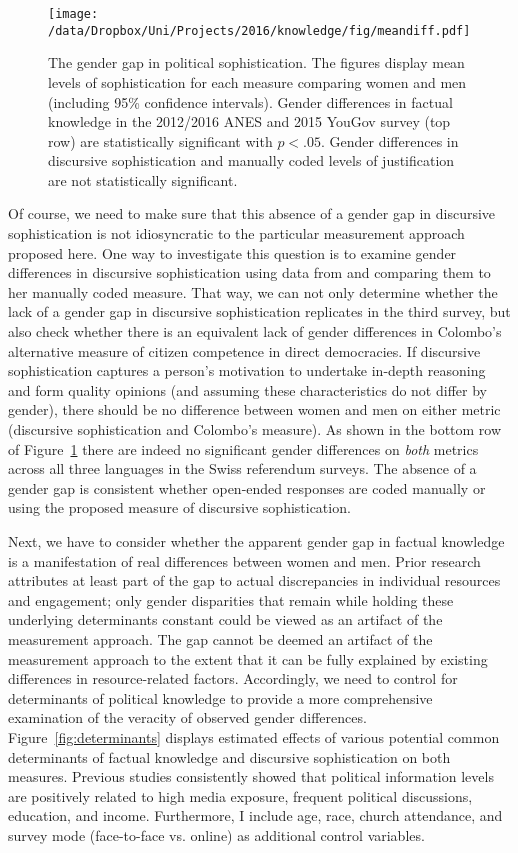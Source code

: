 \begin{figure}[h]\centering
	\texttt{[image: /data/Dropbox/Uni/Projects/2016/knowledge/fig/meandiff.pdf]}
	\caption[The gender gap in political sophistication]{The gender gap in political sophistication. The figures display mean levels of sophistication for each measure comparing women and men (including 95\% confidence intervals). Gender differences in factual knowledge in the 2012/2016 ANES and 2015 YouGov survey (top row) are statistically significant with $p<.05$. Gender differences in discursive sophistication and manually coded levels of justification \citep{colombo2016justifications} are not statistically significant.}\label{fig:meandiff}
\end{figure}

Of course, we need to make sure that this absence of a gender gap in discursive sophistication is not idiosyncratic to the particular measurement approach proposed here. One way to investigate this question is to examine gender differences in discursive sophistication using data from \citet{colombo2016justifications} and comparing them to her manually coded measure. That way, we can not only determine whether the lack of a gender gap in discursive sophistication replicates in the third survey, but also check whether there is an equivalent lack of gender differences in Colombo's alternative measure of citizen competence in direct democracies. If discursive sophistication captures a person's motivation to undertake in-depth reasoning and form quality opinions (and assuming these characteristics do not differ by gender), there should be no difference between women and men on either metric (discursive sophistication and Colombo's measure).  As shown in the bottom row of Figure~\ref{fig:meandiff} there are indeed no significant gender differences on \textit{both} metrics across all three languages in the Swiss referendum surveys. The absence of a gender gap is consistent whether open-ended responses are coded manually or using the proposed measure of discursive sophistication.

Next, we have to consider whether the apparent gender gap in factual knowledge is a manifestation of real differences between women and men. Prior research attributes at least part of the gap to actual discrepancies in individual resources and engagement; only gender disparities that remain while holding these underlying determinants constant could be viewed as an artifact of the measurement approach. The gap cannot be deemed an artifact of the measurement approach to the extent that it can be fully explained by existing differences in resource-related factors. Accordingly, we need to control for determinants of political knowledge to provide a more comprehensive examination of the veracity of observed gender differences. Figure~\ref{fig:determinants} displays estimated effects of various potential common determinants of factual knowledge and discursive sophistication on both measures. Previous studies consistently showed that political information levels are positively related to high media exposure, frequent political discussions, education, and income. Furthermore, I include age, race, church attendance, and survey mode (face-to-face vs. online) as additional control variables.


